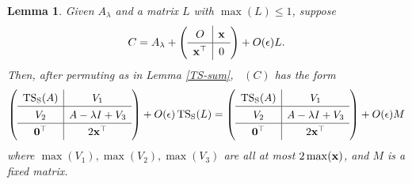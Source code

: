 \documentclass[11pt]{article}
\newtheorem{lem}[thm]{Lemma}
\theoremstyle{definition}
\theoremstyle{definition}
\theoremstyle{definition}
\DeclareMathOperator{\TS}{TS_S}
\newcommand{\bx}{{\bf x}}
\newcommand{\bzero}{{\bf 0}}
\def\trans{^{\top}}
\begin{document}
\begin{lem}
\label{TSper}
Given $A_\lambda$ and a matrix $L$ with $\max(L)\leq 1$, suppose 
\[ C=A_{\lambda} + \left(\renewcommand{\arraystretch}{1.3} \begin{array}{c|c} O & \bx \\ \hline \bx\trans &  0\end{array} \right) + O(\epsilon)L. \]
Then, after permuting as in Lemma \ref{TS-sum}, $\TS(C)$ 
has the form
\[
\left(\renewcommand{\arraystretch}{1.3}
\begin{array}{c|c}
\TS({A}) & V_1\\ \hline
V_2 &  A- \lambda I + V_3\\ \hline
\bzero\trans & 2\bx\trans 
\end{array} 
\right) +O(\epsilon)\TS(L)=\left(\renewcommand{\arraystretch}{1.3}\begin{array}{c|c}
\TS({A}) & V_1\\ \hline
V_2 &  A- \lambda I + V_3\\ \hline
\bzero\trans & 2\bx\trans 
\end{array} 
\right) +O(\epsilon) M
\]
where
$\max (V_1), \max (V_2), \max (V_3)$ are all at most $ 2 \max (\bx) $, and $M$ is a fixed matrix.
\end{lem}
 
\end{document}
